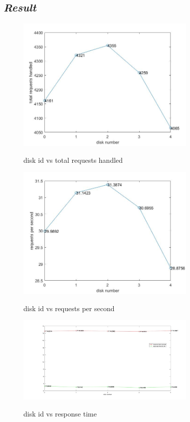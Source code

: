 \documentclass[conference]{IEEEtran}
\begin{document}
\subsection{\emph{\textbf{Result}}}



\begin{figure}[H]
  \centering
  \includegraphics[width=3.4in]{request.jpg}\\
  \caption{disk id vs total requests handled}\label{figure1}
\end{figure}
\begin{figure}[H]
  \centering
  \includegraphics[width=3.4in]{request_per.jpg}\\
  \caption{disk id vs requests per second}\label{figure2}
\end{figure}
\begin{figure}[H]
  \centering
  \includegraphics[width=3.4in]{result.jpg}\\
  \caption{disk id vs response time}\label{figure3}
\end{figure}
\end{document}
